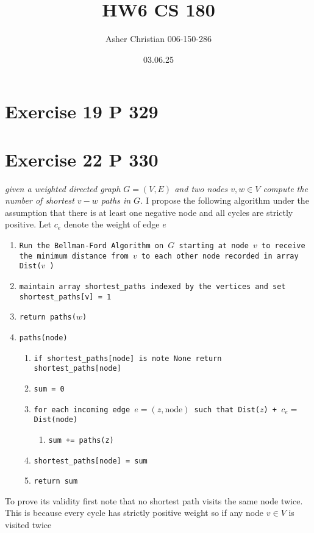 \documentclass{amsart}
\title{HW6 CS 180}
\author{Asher Christian 006-150-286}
\date{ 03.06.25}
\begin{document}
\maketitle
\section{Exercise 19 P 329}
\section{Exercise 22 P 330}
\emph{
    given a weighted directed graph $G = (V,E)$ and two nodes $v,w \in V$ compute the number
    of shortest $v-w$ paths in $G$.
}
I propose the following algorithm under the assumption that there is at least one negative node and all cycles are strictly positive. Let $c_e$ denote the weight of edge $e$
{\small
    \begin{enumerate}
        \item \texttt{Run the Bellman-Ford Algorithm on $G$ starting at node $v$ to receive the
            minimum distance from  $v$ to each other node recorded in array Dist($v$ )}
        \item \texttt{maintain array shortest\_paths indexed by the vertices and set shortest\_paths[v] = 1}
        \item \texttt{return paths($w$)}
        \item \texttt{paths(node)}
            \begin{enumerate}
                \item \texttt{if shortest\_paths[node] is note None return shortest\_paths[node]}
                \item \texttt{sum = 0}
                \item \texttt{for each incoming edge $e = (z,\text{node})$ such that Dist($z$) + $c_e = $ Dist(node)}
                    \begin{enumerate}
                        \item \texttt{sum += paths(z)}
                    \end{enumerate}
                \item \texttt{shortest\_paths[node] = sum}
                \item \texttt{return sum}
            \end{enumerate}
    \end{enumerate}
}
To prove its validity first note that no shortest path visits the same node twice. This is because every cycle has strictly positive weight so if any node $v \in V$ is visited twice
\end{document}
